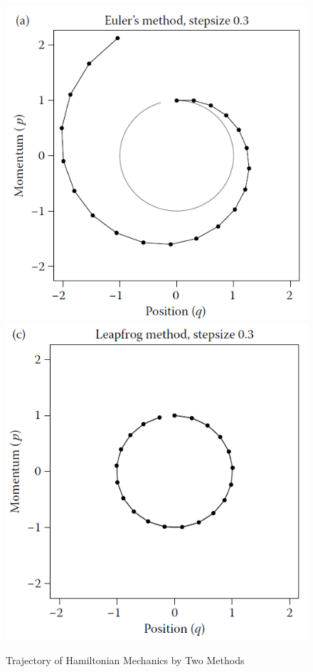 \documentclass[twoside]{article}
\begin{document}
\begin{figure}
\includegraphics[scale=0.6]{euler.png}
\includegraphics[scale=0.6]{leapfrog.png}
\caption{Trajectory of Hamiltonian Mechanics by Two Methods}
\label{trajectory}
\end{figure}
\end{document}
